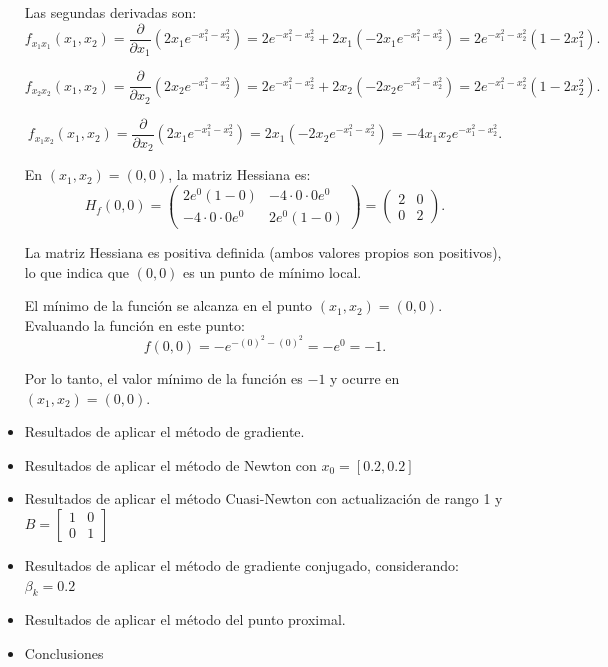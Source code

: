 \documentclass[11pt]{article}
\begin{document}
\begin{itemize}
Las segundas derivadas son:
\[
f_{x_1 x_1}(x_1, x_2) = \frac{\partial}{\partial x_1} (2x_1 e^{-x_1^2 - x_2^2}) = 2 e^{-x_1^2 - x_2^2} + 2x_1 (-2x_1 e^{-x_1^2 - x_2^2}) = 2 e^{-x_1^2 - x_2^2} (1 - 2x_1^2).
\]

\[
f_{x_2 x_2}(x_1, x_2) = \frac{\partial}{\partial x_2} (2x_2 e^{-x_1^2 - x_2^2}) = 2 e^{-x_1^2 - x_2^2} + 2x_2 (-2x_2 e^{-x_1^2 - x_2^2}) = 2 e^{-x_1^2 - x_2^2} (1 - 2x_2^2).
\]

\[
f_{x_1 x_2}(x_1, x_2) = \frac{\partial}{\partial x_2} (2x_1 e^{-x_1^2 - x_2^2}) = 2x_1 (-2x_2 e^{-x_1^2 - x_2^2}) = -4x_1 x_2 e^{-x_1^2 - x_2^2}.
\]

En \((x_1, x_2) = (0, 0)\), la matriz Hessiana es:
\[
H_f(0, 0) = \begin{pmatrix}
2e^0(1-0) & -4 \cdot 0 \cdot 0 e^0 \\
-4 \cdot 0 \cdot 0 e^0 & 2e^0(1-0)
\end{pmatrix} = \begin{pmatrix}
2 & 0 \\
0 & 2
\end{pmatrix}.
\]

La matriz Hessiana es positiva definida (ambos valores propios son positivos), lo que indica que \((0, 0)\) es un punto de mínimo local.


El mínimo de la función se alcanza en el punto \((x_1, x_2) = (0, 0)\). Evaluando la función en este punto:
\[
f(0, 0) = -e^{-(0)^2 - (0)^2} = -e^0 = -1.
\]

Por lo tanto, el valor mínimo de la función es \(-1\) y ocurre en \((x_1, x_2) = (0, 0)\).
\\

    \item Resultados de aplicar el método de gradiente.

    

    \item Resultados de aplicar el método de Newton  con $x_0 =[0.2,0.2]$

    
    
    \item Resultados de aplicar el método Cuasi-Newton con actualización de rango 1 y $B =\begin{bmatrix}1&0\\0&1\end{bmatrix}$

    
    
    \item Resultados de aplicar el método de gradiente conjugado, considerando: $\beta_k = 0.2$

    
    
    \item Resultados de aplicar el método del punto proximal.
    
    
    \item Conclusiones
    


\end{itemize}
\end{document}
